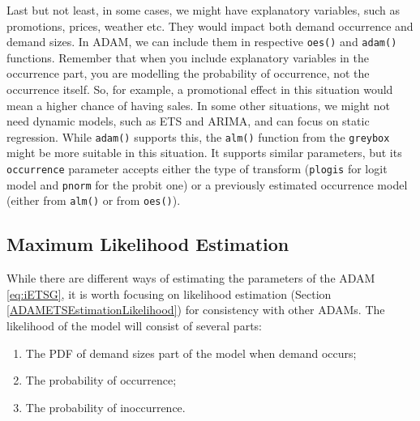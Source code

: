 \documentclass[]{book}
\providecommand{\tightlist}{%
  \setlength{\itemsep}{0pt}\setlength{\parskip}{0pt}}
\theoremstyle{definition}
\theoremstyle{definition}
\theoremstyle{definition}
\theoremstyle{definition}
\theoremstyle{remark}
\begin{document}
Last but not least, in some cases, we might have explanatory variables, such as promotions, prices, weather etc. They would impact both demand occurrence and demand sizes. In ADAM, we can include them in respective \texttt{oes()} and \texttt{adam()} functions. Remember that when you include explanatory variables in the occurrence part, you are modelling the probability of occurrence, not the occurrence itself. So, for example, a promotional effect in this situation would mean a higher chance of having sales. In some other situations, we might not need dynamic models, such as ETS and ARIMA, and can focus on static regression. While \texttt{adam()} supports this, the \texttt{alm()} function from the \texttt{greybox} might be more suitable in this situation. It supports similar parameters, but its \texttt{occurrence} parameter accepts either the type of transform (\texttt{plogis} for logit model and \texttt{pnorm} for the probit one) or a previously estimated occurrence model (either from \texttt{alm()} or from \texttt{oes()}).

\hypertarget{iETSMLE}{%
\subsection{Maximum Likelihood Estimation}\label{iETSMLE}}

While there are different ways of estimating the parameters of the ADAM \eqref{eq:iETSG}, it is worth focusing on likelihood estimation (Section \ref{ADAMETSEstimationLikelihood}) for consistency with other ADAMs. The likelihood of the model will consist of several parts:

\begin{enumerate}
\def\labelenumi{\arabic{enumi}.}
\tightlist
\item
  The PDF of demand sizes part of the model when demand occurs;
\item
  The probability of occurrence;
\item
  The probability of inoccurrence.
\end{enumerate}
\end{document}
